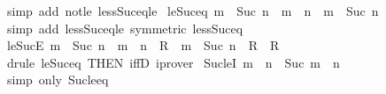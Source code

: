 \begin{isabellebody}
%
\isatagproof
{}\isamarkupfalse%
\ {\isacharparenleft}{\kern0pt}simp\ add{\isacharcolon}{\kern0pt}\ not{\isacharunderscore}{\kern0pt}le\ less{\isacharunderscore}{\kern0pt}Suc{\isacharunderscore}{\kern0pt}eq{\isacharunderscore}{\kern0pt}le{\isacharparenright}{\kern0pt}%
\endisatagproof
{\isafoldproof}%
%
\isadelimproof
\isanewline
%
\endisadelimproof
\isanewline
{}\isamarkupfalse%
\ le{\isacharunderscore}{\kern0pt}Suc{\isacharunderscore}{\kern0pt}eq{\isacharcolon}{\kern0pt}\ {\isachardoublequoteopen}m\ {\isasymle}\ Suc\ n\ {\isasymlongleftrightarrow}\ m\ {\isasymle}\ n\ {\isasymor}\ m\ {\isacharequal}{\kern0pt}\ Suc\ n{\isachardoublequoteclose}\isanewline
%
\isadelimproof
\ \ %
\endisadelimproof
%
\isatagproof
{}\isamarkupfalse%
\ {\isacharparenleft}{\kern0pt}simp\ add{\isacharcolon}{\kern0pt}\ less{\isacharunderscore}{\kern0pt}Suc{\isacharunderscore}{\kern0pt}eq{\isacharunderscore}{\kern0pt}le\ {\isacharbrackleft}{\kern0pt}symmetric{\isacharbrackright}{\kern0pt}\ less{\isacharunderscore}{\kern0pt}Suc{\isacharunderscore}{\kern0pt}eq{\isacharparenright}{\kern0pt}%
\endisatagproof
{\isafoldproof}%
%
\isadelimproof
\isanewline
%
\endisadelimproof
\isanewline
{}\isamarkupfalse%
\ le{\isacharunderscore}{\kern0pt}SucE{\isacharcolon}{\kern0pt}\ {\isachardoublequoteopen}m\ {\isasymle}\ Suc\ n\ {\isasymLongrightarrow}\ {\isacharparenleft}{\kern0pt}m\ {\isasymle}\ n\ {\isasymLongrightarrow}\ R{\isacharparenright}{\kern0pt}\ {\isasymLongrightarrow}\ {\isacharparenleft}{\kern0pt}m\ {\isacharequal}{\kern0pt}\ Suc\ n\ {\isasymLongrightarrow}\ R{\isacharparenright}{\kern0pt}\ {\isasymLongrightarrow}\ R{\isachardoublequoteclose}\isanewline
%
\isadelimproof
\ \ %
\endisadelimproof
%
\isatagproof
{}\isamarkupfalse%
\ {\isacharparenleft}{\kern0pt}drule\ le{\isacharunderscore}{\kern0pt}Suc{\isacharunderscore}{\kern0pt}eq\ {\isacharbrackleft}{\kern0pt}THEN\ iffD{}{\isacharbrackright}{\kern0pt}{\isacharcomma}{\kern0pt}\ iprover{\isacharplus}{\kern0pt}{\isacharparenright}{\kern0pt}%
\endisatagproof
{\isafoldproof}%
%
\isadelimproof
\isanewline
%
\endisadelimproof
\isanewline
{}\isamarkupfalse%
\ Suc{\isacharunderscore}{\kern0pt}leI{\isacharcolon}{\kern0pt}\ {\isachardoublequoteopen}m\ {\isacharless}{\kern0pt}\ n\ {\isasymLongrightarrow}\ Suc\ m\ {\isasymle}\ n{\isachardoublequoteclose}\isanewline
%
\isadelimproof
\ \ %
\endisadelimproof
%
\isatagproof
{}\isamarkupfalse%
\ {\isacharparenleft}{\kern0pt}simp\ only{\isacharcolon}{\kern0pt}\ Suc{\isacharunderscore}{\kern0pt}le{\isacharunderscore}{\kern0pt}eq{\isacharparenright}{\kern0pt}%

\end{isabellebody}
